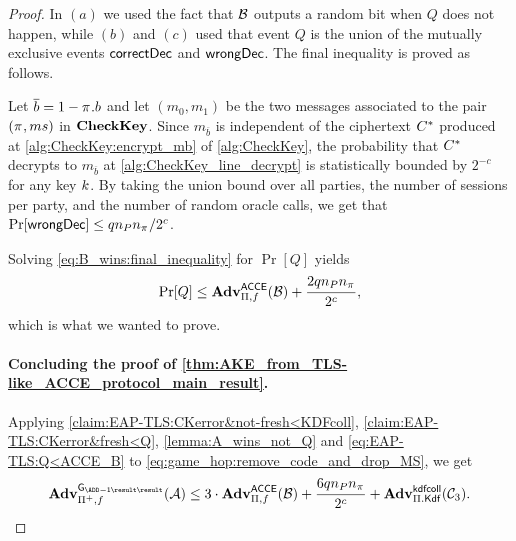 \begin{proof}
In $(a)$ we used the fact that $\A[B]$ outputs a random bit when $Q$ does not happen,
while $(b)$ and $(c)$ used that event $Q$ is the union of the mutually exclusive events $\correct$ and $\wrong$.
The final inequality is proved as follows.


Let $\overline{b} = 1 - \oracle.b$ and let $(m_0,m_1)$ be the two messages associated to the pair $(\oracle,ms)$ in $\CK$.
Since $m_{\overline{b}}$ is independent of the ciphertext $\Ctarget$ produced at \cref{alg:CheckKey:encrypt_mb} of \cref{alg:CheckKey},
the probability that $\Ctarget$ decrypts to $m_{\overline{b}}$ at \cref{alg:CheckKey_line_decrypt} is statistically bounded by $2^{-c}$ for any key $\key$.
By taking the union bound over all parties, 
the number of sessions per party,
and the number of random oracle calls,
we get that $\Pr[\wrong] \leq q \numparties \numsessions / 2^{c}$.

Solving \eqref{eq:B_wins:final_inequality} for $\Pr[Q]$ yields
\begin{equation}\label{eq:EAP-TLS:Q<ACCE_B}
	\Pr[Q] \leq \adv_{\protocol,f}^{\acce}(\A[B]) + \frac{2 \unionbound}{2^{c}} , 
\end{equation}
which is what we wanted to prove.

 

\paragraph{Concluding the proof of \texorpdfstring{\cref{thm:AKE_from_TLS-like_ACCE_protocol_main_result}}{Theorem~\ref{thm:AKE_from_TLS-like_ACCE_protocol_main_result}}.}


Applying \cref{claim:EAP-TLS:CKerror&not-fresh<KDFcoll},  
\cref{claim:EAP-TLS:CKerror&fresh<Q},
\cref{lemma:A_wins_not_Q}
and 
\cref{eq:EAP-TLS:Q<ACCE_B}
to \cref{eq:game_hop:remove_code_and_drop_MS},
we get
\begin{gather}\label{eq:game_hop:remove_code_and_drop_MS_expanded}
	\adv_{\protocolderived,f}^{\mathsf{G_{\prevgame{}}}}(\A)
		\leq 3 \cdot \adv_{\protocol,f}^{\acce}(\A[B])
		+ \frac{6 \unionbound}{2^{c}}
		+\adv_{\protocol.\mathsf{Kdf}}^{\kdfcoll}(\A[C]_3) .
\end{gather}


\end{proof}
